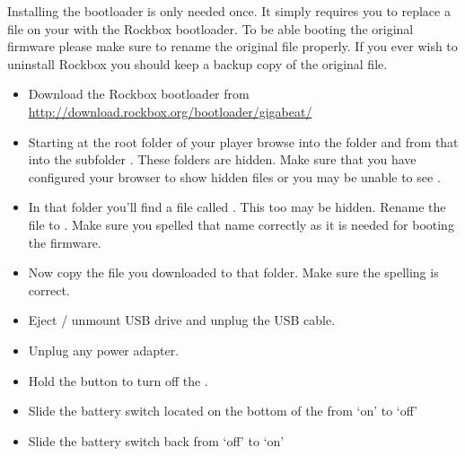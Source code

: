 
Installing the bootloader is only needed once. It simply requires you
to replace a file on your \dap{} with the Rockbox bootloader. To be able
booting the original firmware please make sure to rename the original file
properly. If you ever wish to uninstall Rockbox you should keep a backup copy
of the original file.

\begin{itemize}
\item Download the Rockbox bootloader from
  \url{http://download.rockbox.org/bootloader/gigabeat/}
\item Starting at the root folder of your player browse into the folder
   and from that into the subfolder .
  These folders are hidden. Make sure that you have configured your browser
  to show hidden files or you may be unable to see .
\item In that folder you'll find a file called . This too
  may be hidden. Rename the file to . Make sure you
  spelled that name  correctly as it is needed for booting the \playerman{} firmware.
\item Now copy the file  you downloaded to that folder.
  Make sure the spelling is correct.
\end{itemize}

\begin{itemize}
\item Eject / unmount USB drive and unplug the USB cable.
\item Unplug any power adapter.
\item Hold the \ButtonPower{} button to turn off the \dap{}.
\item Slide the battery switch located on the bottom of the \dap{} from 
    `on' to `off'
\item Slide the battery switch back from `off' to `on'
\end{itemize}
